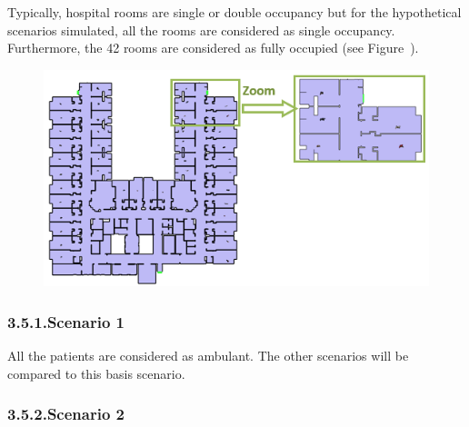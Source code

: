 \documentclass{style/llncs}
\begin{document}
\noindent{}Typically, hospital rooms are single or double occupancy but for the
hypothetical scenarios simulated, all the rooms are considered as single
occupancy. Furthermore, the 42 rooms are considered as fully occupied
(see Figure~).%

\begin{figure}[tbp]%
\begin{mdcenter}%

\noindent{}\includegraphics[keepaspectratio=true,width=\dimmin{}{\dimwidth{1.00}}]{images/FIG_2}{}%

\mdhr{}%

\noindent{}%
\end{mdcenter}\label{path-geom}%
\end{figure}%

\subsubsection{3.5.1.\hspace*{0.5em}Scenario 1}\label{sec-scenario-1}%

\noindent{}All the patients are considered as ambulant. The other scenarios will be
compared to this basis scenario.%

\subsubsection{3.5.2.\hspace*{0.5em}Scenario 2}\label{sec-scenario-2}%
\end{document}
